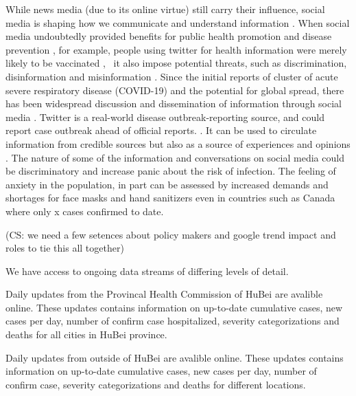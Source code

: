 While news media (due to its online virtue) still carry their influence, social media is shaping how we communicate and understand information \citep{LiuSieg19}.  When social media undoubtedly provided benefits for public health promotion and disease prevention \cite{BascHill20, SunYang20}, for example, people using twitter for health information were merely likely to be vaccinated \citep{AhmeQuin18},  it also impose potential threats, such as discrimination, disinformation and misinformation \citep{ChouOa18, McKevanS19}.  Since the initial reports of cluster of acute severe respiratory disease (COVID-19) and the potential for global spread, there has been widespread discussion and dissemination of information through social media \citep{?}.  Twitter is a real-world disease outbreak-reporting source, and could report case outbreak ahead of official reports. \citep{YoutDara19}.  It can be used to circulate information from credible sources but also as a source of experiences and opinions \citep{ChewEyes10}.  The nature of some of the information and conversations on social media could be discriminatory and increase panic about the risk of infection. The feeling of anxiety in the population, in part can be assessed by increased demands and shortages for face masks and hand sanitizers even in countries such as Canada where only x cases confirmed to date. 

(CS:  we need a few setences about policy makers and google trend impact and roles to tie this all together)




We have access to ongoing data streams of differing levels of detail. 


Daily updates from the Provincal Health Commission of HuBei are avalible online.
These updates contains information on up-to-date cumulative cases, new cases per day, number of confirm case hospitalized, severity categorizations and deaths for all cities in HuBei province.

Daily updates from outside of HuBei are avalible online.
These updates contains information on up-to-date cumulative cases, new cases per day, number of confirm case, severity categorizations and deaths for different locations.


